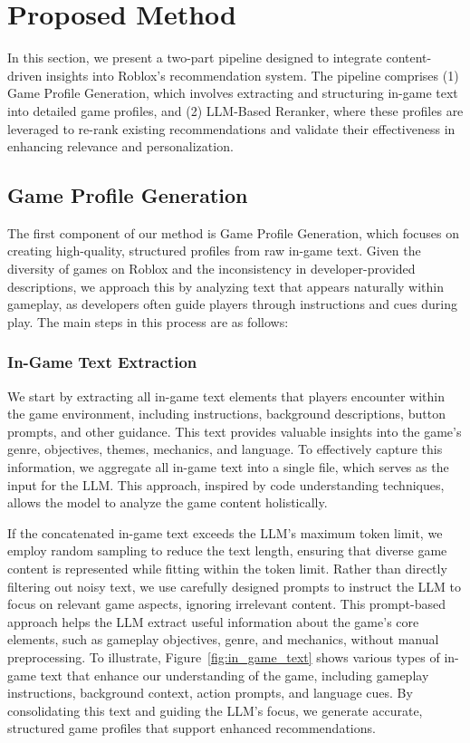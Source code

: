 

\section{Proposed Method}
In this section, we present a two-part pipeline designed to integrate content-driven insights into Roblox’s recommendation system. The pipeline comprises (1) Game Profile Generation, which involves extracting and structuring in-game text into detailed game profiles, and (2) LLM-Based Reranker, where these profiles are leveraged to re-rank existing recommendations and validate their effectiveness in enhancing relevance and personalization.

\subsection{Game Profile Generation}
The first component of our method is Game Profile Generation, which focuses on creating high-quality, structured profiles from raw in-game text. Given the diversity of games on Roblox and the inconsistency in developer-provided descriptions, we approach this by analyzing text that appears naturally within gameplay, as developers often guide players through instructions and cues during play. The main steps in this process are as follows:

\subsubsection{In-Game Text Extraction}
We start by extracting all in-game text elements that players encounter within the game environment, including instructions, background descriptions, button prompts, and other guidance. This text provides valuable insights into the game’s genre, objectives, themes, mechanics, and language. To effectively capture this information, we aggregate all in-game text into a single file, which serves as the input for the LLM. This approach, inspired by code understanding techniques, allows the model to analyze the game content holistically.

If the concatenated in-game text exceeds the LLM’s maximum token limit, we employ random sampling to reduce the text length, ensuring that diverse game content is represented while fitting within the token limit. Rather than directly filtering out noisy text, we use carefully designed prompts to instruct the LLM to focus on relevant game aspects, ignoring irrelevant content. This prompt-based approach helps the LLM extract useful information about the game’s core elements, such as gameplay objectives, genre, and mechanics, without manual preprocessing. To illustrate, Figure~\ref{fig:in_game_text} shows various types of in-game text that enhance our understanding of the game, including gameplay instructions, background context, action prompts, and language cues. By consolidating this text and guiding the LLM’s focus, we generate accurate, structured game profiles that support enhanced recommendations.


